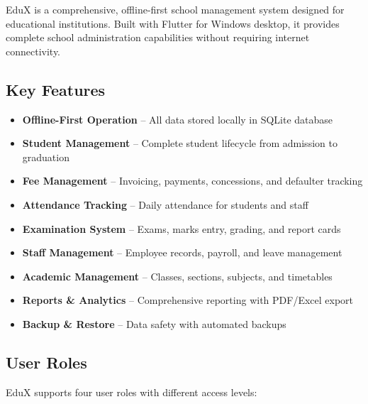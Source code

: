 \documentclass[12pt,a4paper]{report}
\begin{document}
EduX is a comprehensive, offline-first school management system designed for educational institutions. Built with Flutter for Windows desktop, it provides complete school administration capabilities without requiring internet connectivity.

\subsection{Key Features}

\begin{itemize}[leftmargin=*]
    \item \textbf{Offline-First Operation} -- All data stored locally in SQLite database
    \item \textbf{Student Management} -- Complete student lifecycle from admission to graduation
    \item \textbf{Fee Management} -- Invoicing, payments, concessions, and defaulter tracking
    \item \textbf{Attendance Tracking} -- Daily attendance for students and staff
    \item \textbf{Examination System} -- Exams, marks entry, grading, and report cards
    \item \textbf{Staff Management} -- Employee records, payroll, and leave management
    \item \textbf{Academic Management} -- Classes, sections, subjects, and timetables
    \item \textbf{Reports \& Analytics} -- Comprehensive reporting with PDF/Excel export
    \item \textbf{Backup \& Restore} -- Data safety with automated backups
\end{itemize}

\subsection{User Roles}

EduX supports four user roles with different access levels:

\begin{center}
\end{center}
\end{document}
